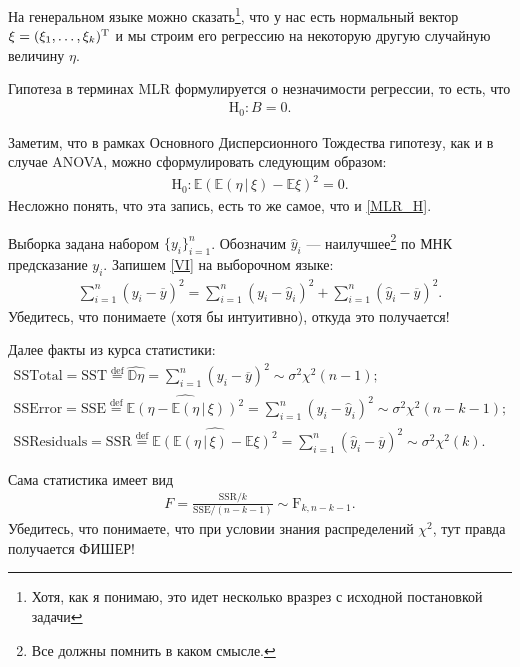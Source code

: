 На генеральном языке можно сказать\footnote{Хотя, как я понимаю, это идет несколько вразрез с исходной постановкой задачи},
что у нас есть нормальный вектор $\xi = (\xi_1, \ldots, \xi_k)^{\mathrm{T}}$ и мы строим его регрессию на некоторую другую случайную величину $\eta$.

Гипотеза в терминах MLR формулируется о незначимости регрессии, то есть, что
\begin{gather}
    \label{MLR_H}
    \mathrm H_0: B = 0.
\end{gather}

Заметим, что в рамках Основного Дисперсионного Тождества гипотезу, как и в случае ANOVA, можно сформулировать следующим образом:
\begin{gather}
    \label{MLR_VI_H}
    \mathrm H_0: \mathbb E(\mathbb E(\eta\, | \, \xi) - \mathbb E \xi)^2 = 0.
\end{gather}
Несложно понять, что эта запись, есть то же самое, что и \eqref{MLR_H}.

Выборка задана набором $\{y_i\}_{i=1}^n$. Обозначим $\hat y_i$ --- наилучшее\footnote{Все должны помнить в каком смысле.} по МНК предсказание $y_i$.
Запишем \eqref{VI} на выборочном языке:
\begin{gather}
    \label{VI_ANOVA}
    \sum_{i=1}^n (y_i - \overline y)^2 = \sum_{i=1}^n (y_{i} - \hat y_i)^2 + \sum_{i=1}^n (\hat y_i - \overline y)^2.
\end{gather}
Убедитесь, что понимаете (хотя бы интуитивно), откуда это получается!

Далее факты из курса статистики:
\begin{gather*}
    \mathrm {SS Total} = \mathrm {SST} \overset{\mathrm{def}}{=} \widehat{\mathbb D \eta} = \sum_{i=1}^n (y_i - \overline y)^2 \sim \mathcal \sigma^2 \chi^2 (n - 1);\\
    \mathrm {SS Error} = \mathrm {SSE} \overset{\mathrm{def}}{=} \widehat{\mathbb E(\eta - \mathbb E(\eta\, | \, \xi))^2} = \sum_{i=1}^n (y_{i} - \hat y_i)^2 \sim \sigma^2 \mathcal \chi^2 (n - k - 1);\\
    \mathrm {SS Residuals} = \mathrm {SSR} \overset{\mathrm{def}}{=} \widehat{\mathbb E(\mathbb E(\eta\, | \, \xi) - \mathbb E \xi)^2} = \sum_{i=1}^n (\hat y_i - \overline y)^2 \sim \sigma^2 \mathcal \chi^2 (k).
\end{gather*}

Сама статистика имеет вид
\begin{gather*}
    F = \frac{\mathrm{SSR} / k}{\mathrm{SSE} / (n - k - 1)} \sim \mathrm F_{k,n-k-1}.
\end{gather*}
Убедитесь, что понимаете, что при условии знания распределений $\chi^2$, тут правда получается ФИШЕР!

